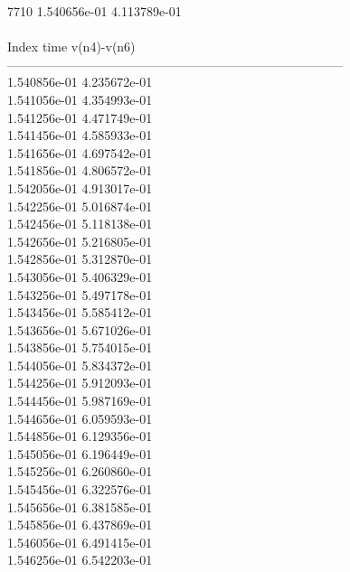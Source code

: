7710	1.540656e-01	4.113789e-01	\\ \hline
\\ \hline
Index   time            v(n4)-v(n6)     \\ \hline
--------------------------------------------------------------------------------\\ 	1.540856e-01	4.235672e-01	\\ 	1.541056e-01	4.354993e-01	\\ 	1.541256e-01	4.471749e-01	\\ 	1.541456e-01	4.585933e-01	\\ 	1.541656e-01	4.697542e-01	\\ 	1.541856e-01	4.806572e-01	\\ 	1.542056e-01	4.913017e-01	\\ 	1.542256e-01	5.016874e-01	\\ 	1.542456e-01	5.118138e-01	\\ 	1.542656e-01	5.216805e-01	\\ 	1.542856e-01	5.312870e-01	\\ 	1.543056e-01	5.406329e-01	\\ 	1.543256e-01	5.497178e-01	\\ 	1.543456e-01	5.585412e-01	\\ 	1.543656e-01	5.671026e-01	\\ 	1.543856e-01	5.754015e-01	\\ 	1.544056e-01	5.834372e-01	\\ 	1.544256e-01	5.912093e-01	\\ 	1.544456e-01	5.987169e-01	\\ 	1.544656e-01	6.059593e-01	\\ 	1.544856e-01	6.129356e-01	\\ 	1.545056e-01	6.196449e-01	\\ 	1.545256e-01	6.260860e-01	\\ 	1.545456e-01	6.322576e-01	\\ 	1.545656e-01	6.381585e-01	\\ 	1.545856e-01	6.437869e-01	\\ 	1.546056e-01	6.491415e-01	\\ 	1.546256e-01	6.542203e-01	\\ \hline
